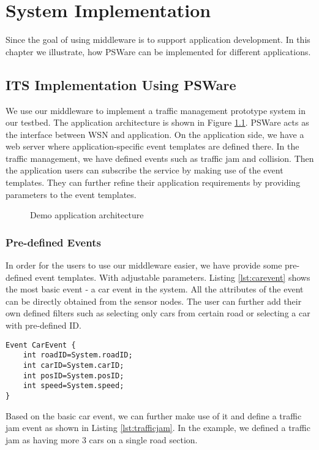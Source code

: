 \chapter{System Implementation}
\label{chapter:implementation}
Since the goal of using middleware is to support application development. In this chapter we illustrate, how PSWare can be implemented for different applications.

\section{ITS Implementation Using PSWare}
We use our middleware to implement a traffic management prototype system in our testbed. The application architecture is shown in Figure \ref{fig:appdemo}. PSWare acts as the interface between WSN and application. On the application side, we have a web server where application-specific event templates are defined there. In the traffic management, we have defined events such as traffic jam and collision. Then the application users can subscribe the service by making use of the event templates. They can further refine their application requirements by providing parameters to the event templates.

\begin{figure}
\centering
{}
\caption{Demo application architecture}
\label{fig:appdemo}
\end{figure}

\subsection{Pre-defined Events}
In order for the users to use our middleware easier, we have provide some pre-defined event templates. With adjustable parameters. Listing \ref{lst:carevent} shows the most basic event - a car event in the system. All the attributes of the event can be directly obtained from the sensor nodes. The user can further add their own defined filters such as selecting only cars from certain road or selecting a car with pre-defined ID.

\begin{lstlisting}[caption=Car event, label=lst:carevent]
Event CarEvent {
	int roadID=System.roadID;
	int carID=System.carID;
	int posID=System.posID;
	int speed=System.speed;
}
\end{lstlisting}

Based on the basic car event, we can further make use of it and define a traffic jam event as shown in Listing \ref{lst:trafficjam}. In the example, we defined a traffic jam as having more 3 cars on a single road section.

